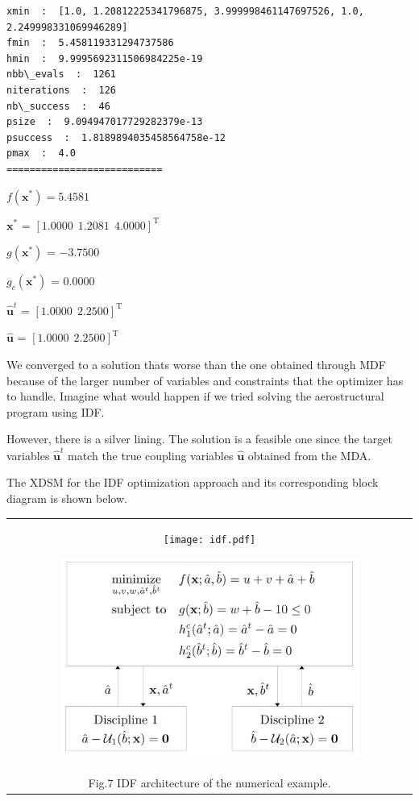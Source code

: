 \documentclass[11pt]{article}
\begin{document}
    \begin{Verbatim}[commandchars=\\\{\}]
xmin  :  [1.0, 1.20812225341796875, 3.999998461147697526, 1.0,
2.249998331069946289]
fmin  :  5.458119331294737586
hmin  :  9.9995692311506984225e-19
nbb\_evals  :  1261
niterations  :  126
nb\_success  :  46
psize  :  9.094947017729282379e-13
psuccess  :  1.8189894035458564758e-12
pmax  :  4.0
===========================
    \end{Verbatim}

    $f(\mathbf{x}^*) = 5.4581$

    
    $\mathbf{x}^*$ = $[1.0000~~1.2081~~4.0000]^\mathrm{T}$

    
    $g(\mathbf{x}^*)$ = $-3.7500$

    
    $g_c(\mathbf{x}^*)$ = $0.0000$

    
    $\hat{\mathbf{u}}^t$ = $[1.0000~~2.2500]^\mathrm{T}$

    
    $\hat{\mathbf{u}}$ = $[1.0000~~2.2500]^\mathrm{T}$

    
    We converged to a solution thats worse than the one obtained through MDF
because of the larger number of variables and constraints that the
optimizer has to handle. Imagine what would happen if we tried solving
the aerostructural program using IDF.

However, there is a silver lining. The solution is a feasible one since
the target variables \(\hat{\mathbf{u}}^t\) match the true coupling
variables \(\hat{\mathbf{u}}\) obtained from the MDA.

The XDSM for the IDF optimization approach and its corresponding block
diagram is shown below.

\begin{longtable}[]{@{}c@{}}
    \toprule
    \endhead
    \begin{minipage}[t]{0.97\columnwidth}\centering
        \begin{figure}
            \centering
            \texttt{[image: idf.pdf]}
        \end{figure}
        \begin{figure}
            \centering
            \includegraphics[width=0.9\textwidth]{images/IDF_diagram_numerical.png}
        \end{figure}
    \end{minipage}\tabularnewline
    Fig.7 IDF architecture of the numerical example.\tabularnewline
    \bottomrule
\end{longtable}
\end{document}
